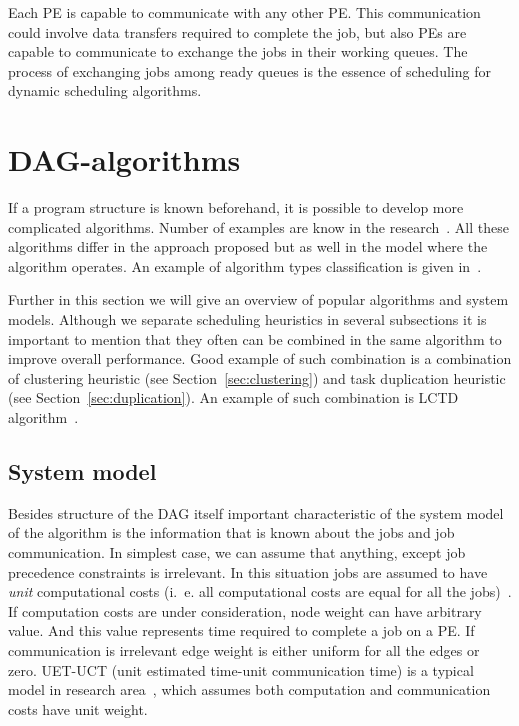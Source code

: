 Each PE is capable to communicate with any other PE. This
communication could involve data transfers required to complete the
job, but also PEs are capable to communicate to exchange the jobs in
their working queues. The process of exchanging jobs among ready
queues is the essence of scheduling for dynamic scheduling algorithms.

\section{DAG-algorithms}
\label{sec:dag_algs}

If a program structure is known beforehand, it is possible to develop
more complicated algorithms. Number of examples are know in the
research~\cite{wu1990hypertool,bittencourt2010dag,wu2000mcp,adam1974,kwok1999static,zheng20131673,Topcuoglu2002}. All
these algorithms differ in the approach proposed but as well in the
model where the algorithm operates. An example of algorithm types
classification is given in~\cite{kwok1999static}.

Further in this section we will give an overview of popular algorithms
and system models. Although we separate scheduling heuristics in
several subsections it is important to mention that they often can be
combined in the same algorithm to improve overall performance. Good
example of such combination is a combination of clustering heuristic
(see Section~\ref{sec:clustering}) and task duplication heuristic (see
Section~\ref{sec:duplication}). An example of such combination is LCTD
algorithm~\cite{chen1993performance}. 

\subsection{System model}
\label{sec:model}

Besides structure of the DAG itself important characteristic of the
system model of the algorithm is the information that is known about
the jobs and job communication. In simplest case, we can assume that
anything, except job precedence constraints is irrelevant. In this
situation jobs are assumed to have \emph{unit} computational costs
(i.~e. all computational costs are equal for all the
jobs)~\cite{Hu1961,adam1974}. If computation costs are under
consideration, node weight can have arbitrary value. And this
value represents time required to complete a job on a PE. If
communication is irrelevant edge weight is either uniform for all the
edges or zero. UET-UCT (unit estimated time-unit communication time)
is a typical model in research area~\cite{finta1996scheduling,
  andronikos2000optimal}, which assumes both computation and
communication costs have unit weight.

